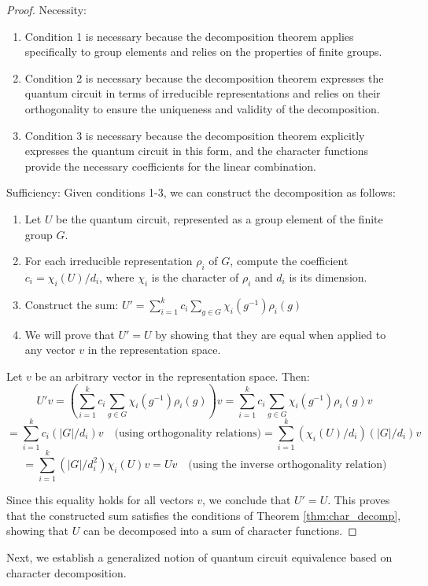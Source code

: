 \documentclass[11pt,a4paper]{article}
\begin{document}
\begin{proof}
Necessity:
\begin{enumerate}
\item Condition 1 is necessary because the decomposition theorem applies specifically to group elements and relies on the properties of finite groups.
\item Condition 2 is necessary because the decomposition theorem expresses the quantum circuit in terms of irreducible representations and relies on their orthogonality to ensure the uniqueness and validity of the decomposition.
\item Condition 3 is necessary because the decomposition theorem explicitly expresses the quantum circuit in this form, and the character functions provide the necessary coefficients for the linear combination.
\end{enumerate}
Sufficiency:
Given conditions 1-3, we can construct the decomposition as follows:
\begin{enumerate}
\item Let $U$ be the quantum circuit, represented as a group element of the finite group $G$.
\item For each irreducible representation $\rho_i$ of $G$, compute the coefficient $c_i = \chi_i(U)/d_i$, where $\chi_i$ is the character of $\rho_i$ and $d_i$ is its dimension.
\item Construct the sum: $U' = \sum_{i=1}^k c_i \sum_{g\in G} \chi_i(g^{-1})\rho_i(g)$
\item We will prove that $U' = U$ by showing that they are equal when applied to any vector $v$ in the representation space.
\end{enumerate}
Let $v$ be an arbitrary vector in the representation space. Then:
\[
U'v = \left(\sum_{i=1}^k c_i \sum_{g\in G} \chi_i(g^{-1})\rho_i(g)\right)v 
= \sum_{i=1}^k c_i \sum_{g\in G} \chi_i(g^{-1})\rho_i(g)v \]\[ 
= \sum_{i=1}^k c_i (|G|/d_i)v \quad\text{(using orthogonality relations)} 
= \sum_{i=1}^k (\chi_i(U)/d_i) (|G|/d_i)v\]
\[
= \sum_{i=1}^k (|G|/d_i^2) \chi_i(U)v 
= Uv \quad\text{(using the inverse orthogonality relation)}
\]

Since this equality holds for all vectors $v$, we conclude that $U' = U$. This proves that the constructed sum satisfies the conditions of Theorem \ref{thm:char_decomp}, showing that $U$ can be decomposed into a sum of character functions.
\end{proof}
Next, we establish a generalized notion of quantum circuit equivalence based on character decomposition.
\end{document}

